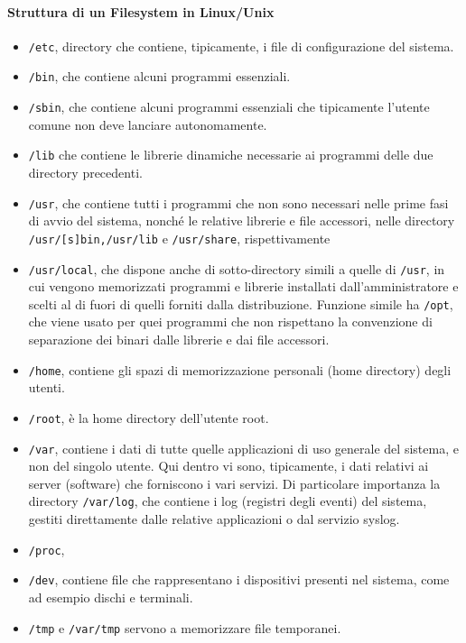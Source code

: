 \documentclass[a4paper]{report}
\begin{document}
\paragraph{Struttura di un Filesystem in Linux/Unix}
\begin{itemize}
\item \texttt{/etc}, directory che contiene, tipicamente, i file di configurazione del sistema.
\item \texttt{/bin}, che contiene alcuni programmi essenziali.
\item \texttt{/sbin}, che contiene alcuni programmi essenziali che tipicamente l'utente
comune non deve lanciare autonomamente.
\item \texttt{/lib} che contiene le librerie dinamiche necessarie ai programmi delle due
directory precedenti.
\item \texttt{/usr}, che contiene tutti i programmi che non sono necessari nelle prime fasi di
avvio del sistema, nonché le relative librerie e file accessori, nelle directory
\texttt{/usr/[s]bin,/usr/lib} e \texttt{/usr/share}, rispettivamente
\item \texttt{/usr/local}, che dispone anche di sotto-directory simili a quelle di \texttt{/usr}, in cui
vengono memorizzati programmi e librerie installati dall'amministratore e scelti
al di fuori di quelli forniti dalla distribuzione. Funzione simile ha \texttt{/opt}, che viene
usato per quei programmi che non rispettano la convenzione di separazione
dei binari dalle librerie e dai file accessori.
\item \texttt{/home}, contiene gli spazi di memorizzazione personali (home directory)
degli utenti.
\item \texttt{/root}, è la home directory dell'utente root.
\item \texttt{/var}, contiene i dati di tutte quelle applicazioni di uso generale del sistema, e
non del singolo utente. Qui dentro vi sono, tipicamente, i dati relativi ai
server (software) che forniscono i vari servizi. Di particolare importanza la
directory \texttt{/var/log}, che contiene i log (registri degli eventi) del sistema,
gestiti direttamente dalle relative applicazioni o dal servizio syslog.
\item \texttt{/proc},
\item \texttt{/dev}, contiene file che rappresentano i dispositivi presenti nel sistema, come
ad esempio dischi e terminali.
\item \texttt{/tmp} e \texttt{/var/tmp} servono a memorizzare file temporanei.
\end{itemize}
\end{document}
